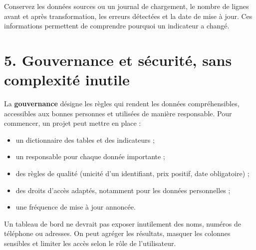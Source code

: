 \documentclass[
  french,
  letterpaper,
  open=any]{scrbook}
\providecommand{\tightlist}{%
  \setlength{\itemsep}{0pt}\setlength{\parskip}{0pt}}
\theoremstyle{definition}
\theoremstyle{definition}
\theoremstyle{remark}
\begin{document}
\begin{tcolorbox}[enhanced jigsaw, arc=.35mm, bottomrule=.15mm, bottomtitle=1mm, breakable, colback=white, colbacktitle=quarto-callout-important-color!10!white, colframe=quarto-callout-important-color-frame, coltitle=black, left=2mm, leftrule=.75mm, opacityback=0, opacitybacktitle=0.6, rightrule=.15mm, title=\textcolor{quarto-callout-important-color}{\faExclamation}\hspace{0.5em}{Qualité et traçabilité}, titlerule=0mm, toprule=.15mm, toptitle=1mm]

Conservez les données sources ou un journal de chargement, le nombre de
lignes avant et après transformation, les erreurs détectées et la date
de mise à jour. Ces informations permettent de comprendre pourquoi un
indicateur a changé.

\end{tcolorbox}

\section{5. Gouvernance et sécurité, sans complexité
inutile}\label{gouvernance-et-suxe9curituxe9-sans-complexituxe9-inutile}

La \textbf{gouvernance} désigne les règles qui rendent les données
compréhensibles, accessibles aux bonnes personnes et utilisées de
manière responsable. Pour commencer, un projet peut mettre en place :

\begin{itemize}
\tightlist
\item
  un dictionnaire des tables et des indicateurs ;
\item
  un responsable pour chaque donnée importante ;
\item
  des règles de qualité (unicité d'un identifiant, prix positif, date
  obligatoire) ;
\item
  des droits d'accès adaptés, notamment pour les données personnelles ;
\item
  une fréquence de mise à jour annoncée.
\end{itemize}

Un tableau de bord ne devrait pas exposer inutilement des noms, numéros
de téléphone ou adresses. On peut agréger les résultats, masquer les
colonnes sensibles et limiter les accès selon le rôle de l'utilisateur.
\end{document}
